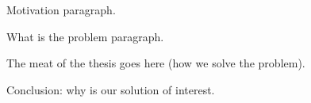 Motivation paragraph. \newline

What is the problem paragraph. \newline

The meat of the thesis goes here (how we solve the problem). \newline

Conclusion: why is our solution of interest.